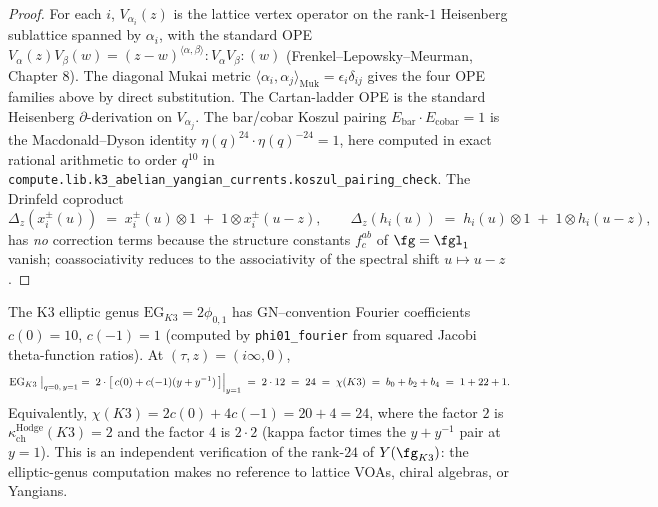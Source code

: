 \begin{proof}
For each $i$, $V_{\alpha_i}(z)$ is the lattice vertex operator on the
rank-$1$ Heisenberg sublattice spanned by $\alpha_i$, with the standard
OPE $V_{\alpha}(z) V_{\beta}(w) = (z-w)^{\langle \alpha, \beta \rangle}
{:}V_{\alpha} V_{\beta}{:}(w)$ (Frenkel--Lepowsky--Meurman, Chapter 8).
The diagonal Mukai metric $\langle \alpha_i, \alpha_j \rangle_{\mathrm{Muk}}
= \epsilon_i \delta_{ij}$ gives the four OPE families above by direct
substitution. The Cartan-ladder OPE is the standard Heisenberg
$\partial$-derivation on $V_{\alpha_j}$. The bar/cobar Koszul pairing
$E_{\mathrm{bar}} \cdot E_{\mathrm{cobar}} = 1$ is the Macdonald--Dyson
identity $\eta(q)^{24} \cdot \eta(q)^{-24} = 1$, here computed in exact
rational arithmetic to order $q^{10}$ in
\texttt{compute.lib.k3\_abelian\_yangian\_currents.koszul\_pairing\_check}.
The Drinfeld coproduct
\[
 \Delta_z(x^\pm_i(u)) \;=\; x^\pm_i(u) \otimes 1 \;+\; 1 \otimes x^\pm_i(u - z),
 \qquad
 \Delta_z(h_i(u)) \;=\; h_i(u) \otimes 1 \;+\; 1 \otimes h_i(u - z),
\]
has \emph{no} correction terms because the structure constants $f^{ab}_c$
of $\fg = \fgl_1$ vanish; coassociativity reduces to the associativity
of the spectral shift $u \mapsto u - z$.
\end{proof}

\begin{remark}
\label{rem:k3-eg-rank-match}
The K$3$ elliptic genus $\mathrm{EG}_{K3} = 2 \phi_{0,1}$ has GN--convention
Fourier coefficients $c(0) = 10$, $c(-1) = 1$ (computed by
\texttt{phi01\_fourier} from squared Jacobi theta-function ratios). At
$(\tau, z) = (i\infty, 0)$,
\[
 \mathrm{EG}_{K3}\bigm|_{q = 0,\, y = 1}
 \;=\; 2 \cdot \bigl[\, c(0) + c(-1)(y + y^{-1}) \,\bigr]\Big|_{y = 1}
 \;=\; 2 \cdot 12 \;=\; 24
 \;=\; \chi(K3)
 \;=\; b_0 + b_2 + b_4 \;=\; 1 + 22 + 1.
\]
Equivalently, $\chi(K3) = 2c(0) + 4c(-1) = 20 + 4 = 24$, where the
factor $2$ is $\kappa_{\mathrm{ch}}^{\mathrm{Hodge}}(K3) = 2$ and the factor $4$
is $2 \cdot 2$ (kappa factor times the $y + y^{-1}$ pair at $y = 1$).
This is an independent verification of the rank-$24$ of $Y(\fg_{K3})$:
the elliptic-genus computation makes no reference to lattice VOAs,
chiral algebras, or Yangians.
\end{remark}

